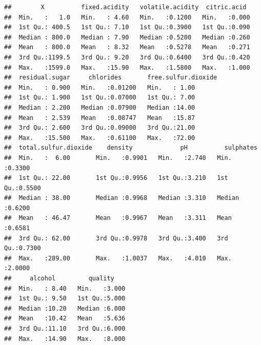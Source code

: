 \documentclass[]{article}
\newenvironment{Shaded}{\begin{snugshade}}{\end{snugshade}}
\newcommand{\KeywordTok}[1]{\textcolor[rgb]{0.13,0.29,0.53}{\textbf{{#1}}}}
\newcommand{\DataTypeTok}[1]{\textcolor[rgb]{0.13,0.29,0.53}{{#1}}}
\newcommand{\DecValTok}[1]{\textcolor[rgb]{0.00,0.00,0.81}{{#1}}}
\newcommand{\StringTok}[1]{\textcolor[rgb]{0.31,0.60,0.02}{{#1}}}
\newcommand{\CommentTok}[1]{\textcolor[rgb]{0.56,0.35,0.01}{\textit{{#1}}}}
\newcommand{\OtherTok}[1]{\textcolor[rgb]{0.56,0.35,0.01}{{#1}}}
\newcommand{\NormalTok}[1]{{#1}}
\begin{document}
\begin{verbatim}
##        X          fixed.acidity   volatile.acidity  citric.acid   
##  Min.   :   1.0   Min.   : 4.60   Min.   :0.1200   Min.   :0.000  
##  1st Qu.: 400.5   1st Qu.: 7.10   1st Qu.:0.3900   1st Qu.:0.090  
##  Median : 800.0   Median : 7.90   Median :0.5200   Median :0.260  
##  Mean   : 800.0   Mean   : 8.32   Mean   :0.5278   Mean   :0.271  
##  3rd Qu.:1199.5   3rd Qu.: 9.20   3rd Qu.:0.6400   3rd Qu.:0.420  
##  Max.   :1599.0   Max.   :15.90   Max.   :1.5800   Max.   :1.000  
##  residual.sugar     chlorides       free.sulfur.dioxide
##  Min.   : 0.900   Min.   :0.01200   Min.   : 1.00      
##  1st Qu.: 1.900   1st Qu.:0.07000   1st Qu.: 7.00      
##  Median : 2.200   Median :0.07900   Median :14.00      
##  Mean   : 2.539   Mean   :0.08747   Mean   :15.87      
##  3rd Qu.: 2.600   3rd Qu.:0.09000   3rd Qu.:21.00      
##  Max.   :15.500   Max.   :0.61100   Max.   :72.00      
##  total.sulfur.dioxide    density             pH          sulphates     
##  Min.   :  6.00       Min.   :0.9901   Min.   :2.740   Min.   :0.3300  
##  1st Qu.: 22.00       1st Qu.:0.9956   1st Qu.:3.210   1st Qu.:0.5500  
##  Median : 38.00       Median :0.9968   Median :3.310   Median :0.6200  
##  Mean   : 46.47       Mean   :0.9967   Mean   :3.311   Mean   :0.6581  
##  3rd Qu.: 62.00       3rd Qu.:0.9978   3rd Qu.:3.400   3rd Qu.:0.7300  
##  Max.   :289.00       Max.   :1.0037   Max.   :4.010   Max.   :2.0000  
##     alcohol         quality     
##  Min.   : 8.40   Min.   :3.000  
##  1st Qu.: 9.50   1st Qu.:5.000  
##  Median :10.20   Median :6.000  
##  Mean   :10.42   Mean   :5.636  
##  3rd Qu.:11.10   3rd Qu.:6.000  
##  Max.   :14.90   Max.   :8.000
\end{verbatim}

\begin{Shaded}
\end{Shaded}
\end{document}
